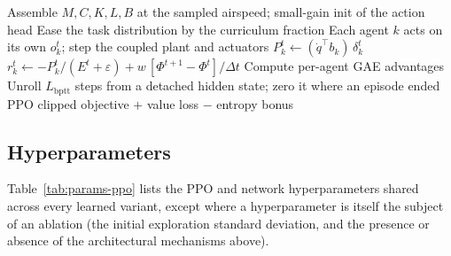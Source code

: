 \documentclass[11pt]{article}
\begin{document}
\begin{algorithm}[h]
\caption{Training with the blended (exact-plus-shaping) credit}
\label{alg:mocca}
\begin{algorithmic}[1]
\State Assemble $M,C,K,L,B$ at the sampled airspeed; small-gain init of the
action head
  \State Ease the task distribution by the curriculum fraction
    \State Each agent $k$ acts on its own $o_k^t$; step the coupled plant and
    actuators
    \State $P_k^t \gets (\dot q^\top b_k)\,\delta_k^t$
    \State $r_k^t \gets -P_k^t/(E^t+\varepsilon)
      + w\,[\Phi^{t+1}-\Phi^{t}]/\Delta t$
  \EndFor
  \State Compute per-agent GAE advantages
    \State Unroll $L_{\mathrm{bptt}}$ steps from a detached hidden state; zero it
    where an episode ended
    \State PPO clipped objective $+$ value loss $-$ entropy bonus
  \EndFor
\EndFor
\end{algorithmic}
\end{algorithm}

\subsection*{Hyperparameters}

Table~\ref{tab:params-ppo} lists the PPO and network hyperparameters
shared across every learned variant, except where a hyperparameter is
itself the subject of an ablation (the initial exploration standard
deviation, and the presence or absence of the architectural mechanisms
above).
\end{document}
